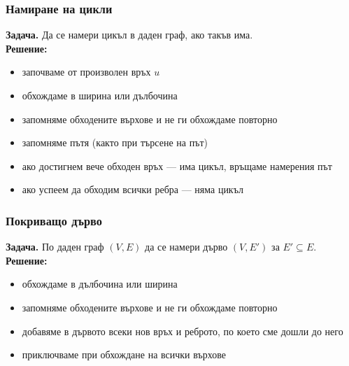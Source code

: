 \documentclass{beamer}
\begin{document}
\begin{frame}
  \frametitle{Намиране на цикли}
  \textbf{Задача. }Да се намери цикъл в даден граф, ако такъв има.\\
  \pause
  \textbf{Решение:}\\
  \begin{itemize}[<+->]
  \item започваме от произволен връх $u$
  \item обхождаме в ширина или дълбочина
  \item запомняме обходените върхове и не ги обхождаме повторно
  \item запомняме пътя (както при търсене на път)
  \item ако достигнем вече обходен връх --- има цикъл, връщаме намерения път
  \item ако успеем да обходим всички ребра --- няма цикъл
  \end{itemize}
\end{frame}

\begin{frame}
  \frametitle{Покриващо дърво}
  \textbf{Задача. }По даден граф $(V,E)$ да се намери дърво $(V,E')$ за $E' \subseteq E$.\\
  \pause
  \textbf{Решение:}\\
  \begin{itemize}[<+->]
  \item обхождаме в дълбочина или ширина
  \item запомняме обходените върхове и не ги обхождаме повторно
  \item добавяме в дървото всеки нов връх и реброто, по което сме дошли до него
  \item приключваме при обхождане на всички върхове
  \end{itemize}
\end{frame}
\end{document}
